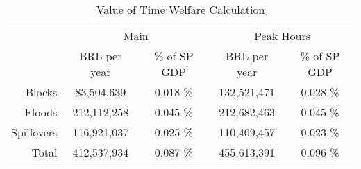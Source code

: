 \captionsetup{labelsep=newline}
\begin{table}[!htbp]
\centering

\caption{Value of Time Welfare Calculation}
\label{table:VOT-main}

  \begin{tabular}{r c c c c}
    \hline
    \hline
     & \multicolumn{2}{c}{Main} & \multicolumn{2}{c}{Peak Hours} \\
     & BRL per year & \% of SP GDP & BRL per year & \% of SP GDP\\
     \hline
     Blocks & 83,504,639 & 0.018 \% & 132,521,471 & 0.028 \% \\
     Floods & 212,112,258 & 0.045 \% & 212,682,463 & 0.045 \% \\
     Spillovers & 116,921,037 & 0.025 \% & 110,409,457 & 0.023 \% \\
     \hline
     Total & 412,537,934 & 0.087 \% & 455,613,391 & 0.096 \%\\
     \hline
     \hline
   \end{tabular}
\end{table}